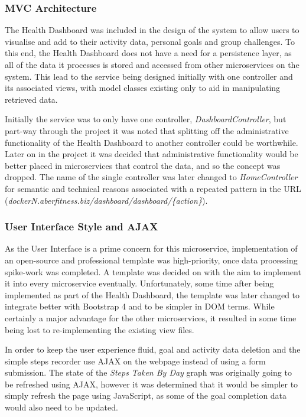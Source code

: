 \subsubsection{MVC Architecture}
\par
The Health Dashboard was included in the design of the system to allow users to visualise and add to their activity data, personal goals and group challenges. To this end, the Health Dashboard does not have a need for a persistence layer, as all of the data it processes is stored and accessed from other microservices on the system. This lead to the service being designed initially with one controller and its associated views, with model classes existing only to aid in manipulating retrieved data.

\par
Initially the service was to only have one controller, \textit{DashboardController}, but part-way through the project it was noted that splitting off the administrative functionality of the Health Dashboard to another controller could be worthwhile. Later on in the project it was decided that administrative functionality would be better placed in microservices that control the data, and so the concept was dropped. The name of the single controller was later changed to \textit{HomeController} for semantic and technical reasons associated with a repeated pattern in the URL (\textit{dockerN.aberfitness.biz/dashboard/dashboard/\{action\}}).

\subsubsection{User Interface Style and AJAX}
\par
As the User Interface is a prime concern for this microservice, implementation of an open-source and professional template was high-priority, once data processing spike-work was completed. A template was decided on with the aim to implement it into every microservice eventually. Unfortunately, some time after being implemented as part of the Health Dashboard, the template was later changed to integrate better with Bootstrap 4 and to be simpler in DOM terms. While certainly a major advantage for the other microservices, it resulted in some time being lost to re-implementing the existing view files.

\par
In order to keep the user experience fluid, goal and activity data deletion and the simple steps recorder use AJAX on the webpage instead of using a form submission. The state of the \textit{Steps Taken By Day} graph was originally going to be refreshed using AJAX, however it was determined that it would be simpler to simply refresh the page using JavaScript, as some of the goal completion data would also need to be updated.

